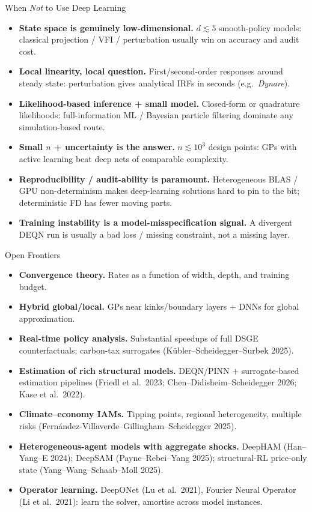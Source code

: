\documentclass[aspectratio=169,11pt]{beamer}
\begin{document}
\begin{frame}{When \emph{Not} to Use Deep Learning}
\small
\begin{itemize}
    \item \textbf{State space is genuinely low-dimensional.}  $d\lesssim 5$ smooth-policy models: classical projection / VFI / perturbation usually win on accuracy and audit cost.
    \item \textbf{Local linearity, local question.}  First/second-order responses around steady state: perturbation gives analytical IRFs in seconds (e.g.\ \emph{Dynare}).
    \item \textbf{Likelihood-based inference + small model.}  Closed-form or quadrature likelihoods: full-information ML / Bayesian particle filtering dominate any simulation-based route.
    \item \textbf{Small $n$ + uncertainty is the answer.}  $n\lesssim 10^3$ design points: GPs with active learning beat deep nets of comparable complexity.
    \item \textbf{Reproducibility / audit-ability is paramount.}  Heterogeneous BLAS / GPU non-determinism makes deep-learning solutions hard to pin to the bit; deterministic FD has fewer moving parts.
    \item \textbf{Training instability is a model-misspecification signal.}  A divergent DEQN run is usually a bad loss / missing constraint, not a missing layer.
\end{itemize}
\end{frame}

\begin{frame}{Open Frontiers}
\small
\begin{itemize}
    \item \textbf{Convergence theory.}  Rates as a function of width, depth, and training budget.
    \item \textbf{Hybrid global/local.}  GPs near kinks/boundary layers + DNNs for global approximation.
    \item \textbf{Real-time policy analysis.}  Substantial speedups of full DSGE counterfactuals; carbon-tax surrogates (K\"ubler--Scheidegger--Surbek 2025).
    \item \textbf{Estimation of rich structural models.}  DEQN/PINN $+$ surrogate-based estimation pipelines (Friedl et al.\ 2023; Chen--Didisheim--Scheidegger 2026; Kase et al.\ 2022).
    \item \textbf{Climate--economy IAMs.}  Tipping points, regional heterogeneity, multiple risks (Fern\'andez-Villaverde--Gillingham--Scheidegger 2025).
    \item \textbf{Heterogeneous-agent models with aggregate shocks.}  DeepHAM (Han--Yang--E 2024); DeepSAM (Payne--Rebei--Yang 2025); structural-RL price-only state (Yang--Wang--Schaab--Moll 2025).
    \item \textbf{Operator learning.}  DeepONet (Lu et al.\ 2021), Fourier Neural Operator (Li et al.\ 2021): learn the solver, amortise across model instances.
\end{itemize}
\end{frame}
\end{document}
